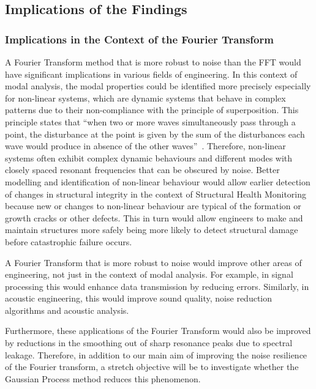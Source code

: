 \documentclass[12pt]{article}
\begin{document}
    \subsection{Implications of the Findings}

    \subsubsection{Implications in the Context of the Fourier Transform}

    A Fourier Transform method that is more robust to noise than the FFT would have significant implications in various fields of engineering.
    In this context of modal analysis, the modal properties could be identified more precisely especially for non-linear systems, which are dynamic systems that behave in complex patterns due to their non-compliance with the principle of superposition.
    This principle states that ``when two or more waves simultaneously pass through a point, the disturbance at the point is given by the sum of the disturbances each wave would produce in absence of the other waves''~\cite{StudyComSuperposition}.
    Therefore, non-linear systems often exhibit complex dynamic behaviours and different modes with closely spaced resonant frequencies that can be obscured by noise.
    Better modelling and identification of non-linear behaviour would allow earlier detection of changes in structural integrity in the context of Structural Health Monitoring because new or changes to non-linear behaviour are typical of the formation or growth cracks or other defects.
    This in turn would allow engineers to make and maintain structures more safely being more likely to detect structural damage before catastrophic failure occurs.

    A Fourier Transform that is more robust to noise would improve other areas of engineering, not just in the context of modal analysis.
    For example, in signal processing this would enhance data transmission by reducing errors.
    Similarly, in acoustic engineering, this would improve sound quality, noise reduction algorithms and acoustic analysis.

    Furthermore, these applications of the Fourier Transform would also be improved by reductions in the smoothing out of sharp resonance peaks due to spectral leakage.
    Therefore, in addition to our main aim of improving the noise resilience of the Fourier transform, a stretch objective will be to investigate whether the Gaussian Process method reduces this phenomenon.
\end{document}
